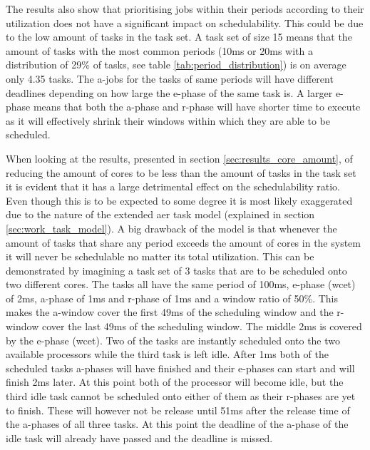 \documentclass{kththesis}
\begin{document}
The results also show that prioritising jobs within their periods according to their utilization
does not have a significant impact on schedulability. This could be due to the low amount of tasks
in the task set. A task set of size 15 means that the amount of tasks with the most common periods
(10ms or 20ms with a distribution of 29\% of tasks, see table \ref{tab:period_distribution}) is on
average only 4.35 tasks. The \acrshort{a}-jobs for the tasks of same periods will have different
deadlines depending on how large the \acrshort{e}-phase of the same task is. A larger
\acrshort{e}-phase means that both the \acrshort{a}-phase and \acrshort{r}-phase will have shorter
time to execute as it will effectively shrink their windows within which they are able to be
scheduled.

When looking at the results, presented in section \ref{sec:results_core_amount}, of reducing the
amount of cores to be less than the amount of tasks in the task set it is evident that it has a
large detrimental effect on the schedulability ratio. Even though this is to be expected to some
degree it is most likely exaggerated due to the nature of the extended \acrshort{aer} task model
(explained in section \ref{sec:work_task_model}). A big drawback of the model is that whenever the
amount of tasks that share any period exceeds the amount of cores in the system it will never be
schedulable no matter its total utilization. This can be demonstrated by imagining a task set of 3
tasks that are to be scheduled onto two different cores. The tasks all have the same period of
100ms, \acrshort{e}-phase (\acrshort{wcet}) of 2ms, \acrshort{a}-phase of 1ms and \acrshort{r}-phase
of 1ms and a window ratio of 50\%. This makes the \acrshort{a}-window cover the first 49ms of the
scheduling window and the \acrshort{r}-window cover the last 49ms of the scheduling window. The
middle 2ms is covered by the \acrshort{e}-phase (\acrshort{wcet}). Two of the tasks are instantly
scheduled onto the two available processors while the third task is left idle. After 1ms both of the
scheduled tasks \acrshort{a}-phases will have finished and their \acrshort{e}-phases can start and
will finish 2ms later. At this point both of the processor will become idle, but the third idle task
cannot be scheduled onto either of them as their \acrshort{r}-phases are yet to finish. These will
however not be release until 51ms after the release time of the \acrshort{a}-phases of all three
tasks. At this point the deadline of the \acrshort{a}-phase of the idle task will already have
passed and the deadline is missed.
\end{document}
